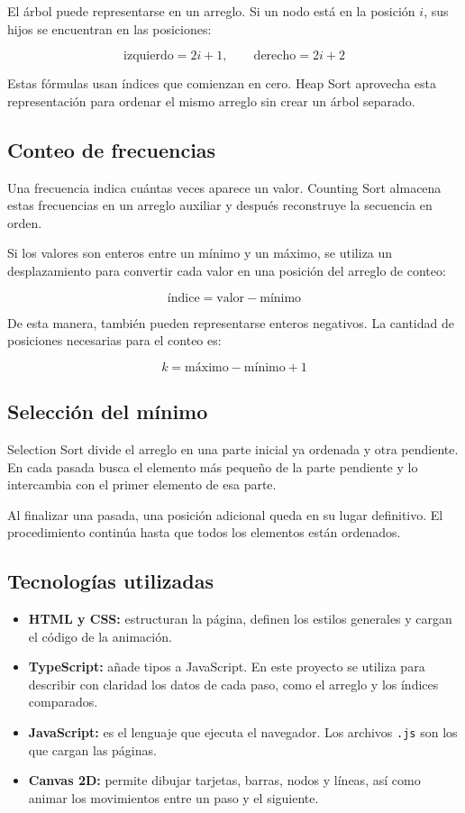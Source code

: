 \documentclass[12pt,a4paper]{article}
\begin{document}
El árbol puede representarse en un arreglo. Si un nodo está en la posición \(i\), sus hijos se encuentran en las posiciones:

\[
\text{izquierdo}=2i+1, \qquad
\text{derecho}=2i+2
\]

Estas fórmulas usan índices que comienzan en cero. Heap Sort aprovecha esta representación para ordenar el mismo arreglo sin crear un árbol separado.

\subsection{Conteo de frecuencias}

Una frecuencia indica cuántas veces aparece un valor. Counting Sort almacena estas frecuencias en un arreglo auxiliar y después reconstruye la secuencia en orden.

Si los valores son enteros entre un mínimo y un máximo, se utiliza un desplazamiento para convertir cada valor en una posición del arreglo de conteo:

\[
\text{índice}=\text{valor}-\text{mínimo}
\]

De esta manera, también pueden representarse enteros negativos. La cantidad de posiciones necesarias para el conteo es:

\[
k=\text{máximo}-\text{mínimo}+1
\]

\subsection{Selección del mínimo}

Selection Sort divide el arreglo en una parte inicial ya ordenada y otra pendiente. En cada pasada busca el elemento más pequeño de la parte pendiente y lo intercambia con el primer elemento de esa parte.

Al finalizar una pasada, una posición adicional queda en su lugar definitivo. El procedimiento continúa hasta que todos los elementos están ordenados.

\subsection{Tecnologías utilizadas}

\begin{itemize}
    \item \textbf{HTML y CSS:} estructuran la página, definen los estilos generales y cargan el código de la animación.
    \item \textbf{TypeScript:} añade tipos a JavaScript. En este proyecto se utiliza para describir con claridad los datos de cada paso, como el arreglo y los índices comparados.
    \item \textbf{JavaScript:} es el lenguaje que ejecuta el navegador. Los archivos \texttt{.js} son los que cargan las páginas.
    \item \textbf{Canvas 2D:} permite dibujar tarjetas, barras, nodos y líneas, así como animar los movimientos entre un paso y el siguiente.
\end{itemize}
\end{document}
